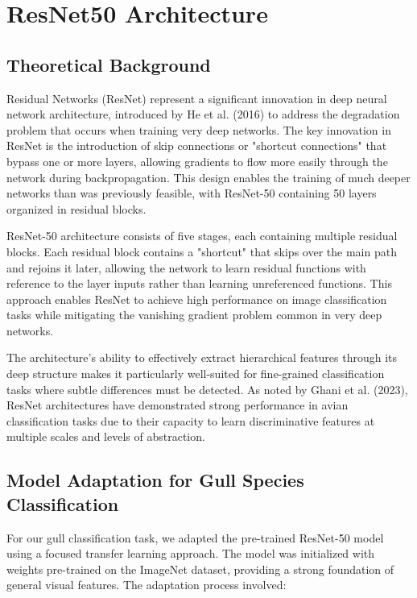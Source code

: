 


\section{ResNet50 Architecture}

\subsection{Theoretical Background}

Residual Networks (ResNet) represent a significant innovation in deep neural network architecture, introduced by He et al. (2016) to address the degradation problem that occurs when training very deep networks. The key innovation in ResNet is the introduction of skip connections or "shortcut connections" that bypass one or more layers, allowing gradients to flow more easily through the network during backpropagation\citep{residual2016}. This design enables the training of much deeper networks than was previously feasible, with ResNet-50 containing 50 layers organized in residual blocks\citep{resnet50blog}.

ResNet-50 architecture consists of five stages, each containing multiple residual blocks. Each residual block contains a "shortcut" that skips over the main path and rejoins it later, allowing the network to learn residual functions with reference to the layer inputs rather than learning unreferenced functions\citep{residual2016}\citep{exploratiojournal}. This approach enables ResNet to achieve high performance on image classification tasks while mitigating the vanishing gradient problem common in very deep networks.

The architecture's ability to effectively extract hierarchical features through its deep structure makes it particularly well-suited for fine-grained classification tasks where subtle differences must be detected. As noted by Ghani et al. (2023), ResNet architectures have demonstrated strong performance in avian classification tasks due to their capacity to learn discriminative features at multiple scales and levels of abstraction.

\subsection{Model Adaptation for Gull Species Classification}

For our gull classification task, we adapted the pre-trained ResNet-50 model using a focused transfer learning approach. The model was initialized with weights pre-trained on the ImageNet dataset, providing a strong foundation of general visual features. The adaptation process involved:

